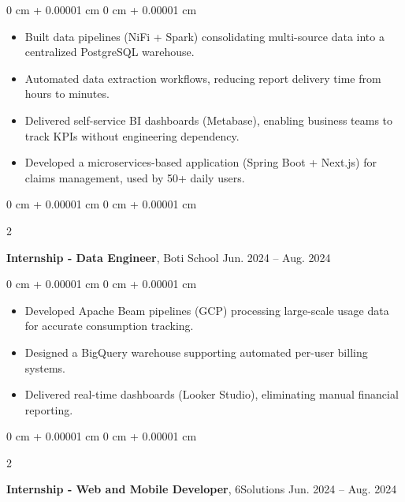 \documentclass[10pt, letterpaper]{article}
\newenvironment{highlights}{
    \begin{itemize}[
        topsep=0.10 cm,
        parsep=0.10 cm,
        partopsep=0pt,
        itemsep=0pt,
        leftmargin=0 cm + 10pt
    ]
}{
    \end{itemize}
} %
\newenvironment{onecolentry}{
    \begin{adjustwidth}{
        0 cm + 0.00001 cm
    }{
        0 cm + 0.00001 cm
    }
}{
    \end{adjustwidth}
} %
\newenvironment{twocolentry}[2][]{
    \onecolentry
    \def\secondColumn{#2}
    \setcolumnwidth{\fill, 4.5 cm}
    \begin{paracol}{2}
}{
    \switchcolumn \raggedleft \secondColumn
    \end{paracol}
    \endonecolentry
} %
\begin{document}
        \vspace{0.10 cm}
        \begin{onecolentry}
            \begin{highlights}
\item Built data pipelines (NiFi + Spark) consolidating multi-source data into a centralized PostgreSQL warehouse.
    \item Automated data extraction workflows, reducing report delivery time from hours to minutes.
    \item Delivered self-service BI dashboards (Metabase), enabling business teams to track KPIs without engineering dependency.
    \item Developed a microservices-based application (Spring Boot + Next.js) for claims management, used by 50+ daily users.
            \end{highlights}
        \end{onecolentry}


        \vspace{0.2 cm}
        
        \begin{twocolentry}{
            Jun. 2024 – Aug. 2024
        }
            \textbf{Internship - Data Engineer}, Boti School \end{twocolentry}

        \vspace{0.10 cm}
        \begin{onecolentry}
            \begin{highlights}
\item Developed Apache Beam pipelines (GCP) processing large-scale usage data for accurate consumption tracking.
    \item Designed a BigQuery warehouse supporting automated per-user billing systems.
    \item Delivered real-time dashboards (Looker Studio), eliminating manual financial reporting.
                
            \end{highlights}
        \end{onecolentry}



        \vspace{0.2 cm}

        \begin{twocolentry}{
            Jun. 2024 – Aug. 2024
        }
            \textbf{Internship - Web and Mobile Developer}, 6Solutions\end{twocolentry}
\end{document}
